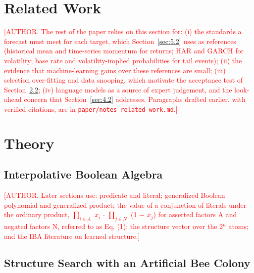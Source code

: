 \documentclass[review]{elsarticle}
\begin{document}
\section{Related Work}\label{sec:2}

\textcolor{red}{[AUTHOR. The rest of the paper relies on this section for: (i) the standards a forecast must meet for each target, which Section~\ref{sec:5.2} uses as references (historical mean and time-series momentum for returns; HAR and GARCH for volatility; base rate and volatility-implied probabilities for tail events); (ii) the evidence that machine-learning gains over these references are small; (iii) selection over-fitting and data snooping, which motivate the acceptance test of Section~\ref{sec:3.2}; (iv) language models as a source of expert judgement, and the look-ahead concern that Section~\ref{sec:4.2} addresses. Paragraphs drafted earlier, with verified citations, are in \texttt{paper/\allowbreak{}notes\_related\_work.md}.]}

\section{Theory}\label{sec:3}

\subsection{Interpolative Boolean Algebra}\label{sec:3.1}

\textcolor{red}{[AUTHOR. Later sections use: predicate and literal; generalized Boolean polynomial and generalized product; the value of a conjunction of literals under the ordinary product, \ensuremath{\prod _{i\in A}} \ensuremath{x_{i}} \ensuremath{\cdot} \ensuremath{\prod _{j\in N}} (1 \ensuremath{-} \ensuremath{x_{j}}) for asserted factors A and negated factors N, referred to as Eq. (1); the structure vector over the 2\ensuremath{^{n}} atoms; and the IBA literature on learned structure.]}

\subsection{Structure Search with an Artificial Bee Colony}\label{sec:3.2}
\end{document}
